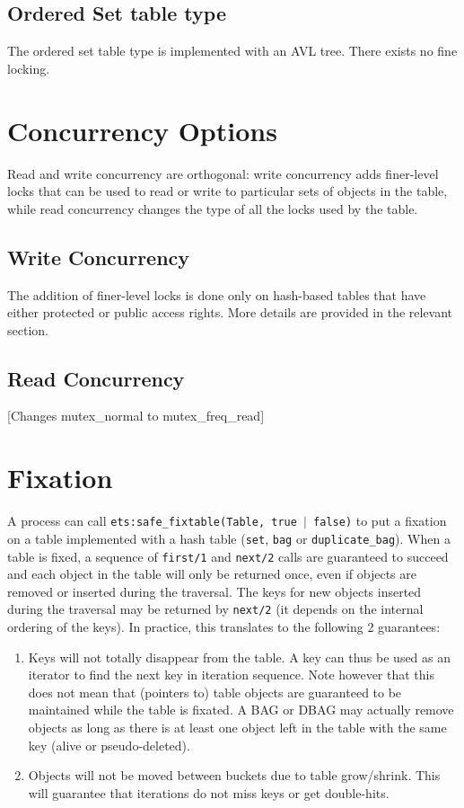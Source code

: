 \documentclass[aps,pre,preprint,nofootinbib]{revtex4}
\begin{document}
\subsection{Ordered Set table type}

The ordered set table type is implemented with an AVL tree.
There exists no fine locking.

\section{Concurrency Options} \label{sec:concurrency_options}

Read and write concurrency are orthogonal:
write concurrency adds finer-level locks that can be used to read or write to particular sets of objects in the table, while read concurrency changes the type of all the locks used by the table.

\subsection{Write Concurrency}

The addition of finer-level locks is done only on hash-based tables that have either protected or public access rights.
More details are provided in the relevant section.

\subsection{Read Concurrency}

[Changes mutex\_normal to mutex\_freq\_read]

\section{Fixation}

A process can call \texttt{ets:safe\_fixtable(Table, true $|$ false)} to put a fixation on a table implemented with a hash table (\verb|set|, \verb|bag| or \verb|duplicate_bag|).
When a table is fixed, a sequence of \verb|first/1| and \verb|next/2| calls are guaranteed to succeed and each object in the table will only be returned once, even if objects are removed or inserted during the traversal.
The keys for new objects inserted during the traversal may be returned by \verb|next/2| (it depends on the internal ordering of the keys).
In practice, this translates to the following 2 guarantees:

\begin{enumerate}
  \item Keys will not totally disappear from the table.
    A key can thus be used as an iterator to find the next key in iteration sequence.
    Note however that this does not mean that (pointers to) table objects are guaranteed to be maintained while the table is fixated.
    A BAG or DBAG may actually remove objects as long as there is at least one object left in the table with the same key (alive or pseudo-deleted).
    \item Objects will not be moved between buckets due to table grow/shrink.
      This will guarantee that iterations do not miss keys or get double-hits.
\end{enumerate}
\end{document}
